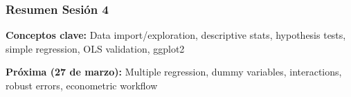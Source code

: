 \documentclass[aspectratio=169,11pt]{beamer}
\begin{document}
\begin{frame}
  \frametitle{Resumen Sesión 4}

  \small
  \setlength{\itemsep}{2pt}
  \textbf{Conceptos clave:} Data import/exploration, descriptive stats, hypothesis tests, simple regression, OLS validation, ggplot2

  \vspace{0.3cm}
  \textbf{Próxima (27 de marzo):} Multiple regression, dummy variables, interactions, robust errors, econometric workflow
\end{frame}
\end{document}
